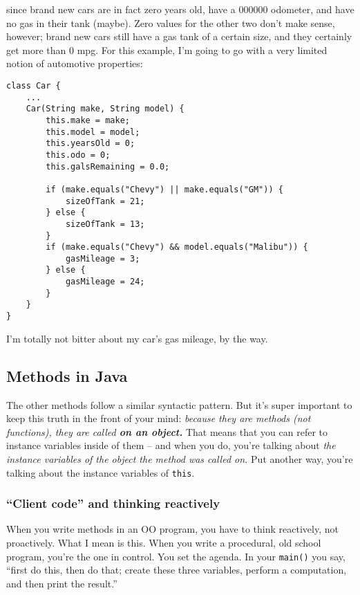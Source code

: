 since brand new cars are in fact zero years old, have a 000000 odometer, and
have no gas in their tank (maybe). Zero values for the other two don't make
sense, however; brand new cars still have a gas tank of a certain size, and
they certainly get more than 0 mpg. For this example, I'm going to go with a
very limited notion of automotive properties:

\begin{Verbatim}[samepage=true,fontsize=\scriptsize,frame=single]
class Car {
    ...
    Car(String make, String model) {
        this.make = make;
        this.model = model;
        this.yearsOld = 0;
        this.odo = 0;
        this.galsRemaining = 0.0;
        
        if (make.equals("Chevy") || make.equals("GM")) {
            sizeOfTank = 21;
        } else {
            sizeOfTank = 13;
        }
        if (make.equals("Chevy") && model.equals("Malibu")) {
            gasMileage = 3;
        } else {
            gasMileage = 24;
        }
    }
}
\end{Verbatim}

I'm totally not bitter about my car's gas mileage, by the way.

\subsection{Methods in Java}

The other methods follow a similar syntactic pattern. But it's super important
to keep this truth in the front of your mind: \textit{because they are methods
(not functions), they are called \textbf{on an object.}} That means that
you can refer to instance variables inside of them -- and when you do, you're
talking about \textit{the instance variables of the object the method was
called on.} Put another way, you're talking about the instance variables of
\texttt{this}.

\subsubsection{``Client code'' and thinking reactively}

When you write methods in an OO program, you have to think reactively, not
proactively. What I mean is this. When you write a procedural, old school
program, you're the one in control. You set the agenda. In your
\texttt{main()} you say, ``first do this, then do that; create these three
variables, perform a computation, and then print the result.''

